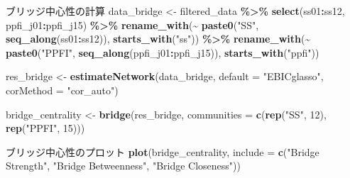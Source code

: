 \documentclass[12pt,a4paper,xelatex,ja=standard]{bxjsarticle}
\newenvironment{Shaded}{\begin{snugshade}}{\end{snugshade}}
\newcommand{\AttributeTok}[1]{\textcolor[rgb]{0.13,0.29,0.53}{#1}}
\newcommand{\DecValTok}[1]{\textcolor[rgb]{0.00,0.00,0.81}{#1}}
\newcommand{\FunctionTok}[1]{\textcolor[rgb]{0.13,0.29,0.53}{\textbf{#1}}}
\newcommand{\NormalTok}[1]{#1}
\newcommand{\OtherTok}[1]{\textcolor[rgb]{0.56,0.35,0.01}{#1}}
\newcommand{\SpecialCharTok}[1]{\textcolor[rgb]{0.81,0.36,0.00}{\textbf{#1}}}
\newcommand{\StringTok}[1]{\textcolor[rgb]{0.31,0.60,0.02}{#1}}
\begin{document}
\begin{Shaded}
\begin{Highlighting}[]
\NormalTok{ブリッジ中心性の計算}
\NormalTok{data\_bridge }\OtherTok{\textless{}{-}}\NormalTok{ filtered\_data }\SpecialCharTok{\%\textgreater{}\%} 
  \FunctionTok{select}\NormalTok{(ss01}\SpecialCharTok{:}\NormalTok{ss12, ppfi\_j01}\SpecialCharTok{:}\NormalTok{ppfi\_j15) }\SpecialCharTok{\%\textgreater{}\%}
  \FunctionTok{rename\_with}\NormalTok{(}\SpecialCharTok{\textasciitilde{}} \FunctionTok{paste0}\NormalTok{(}\StringTok{"SS"}\NormalTok{, }\FunctionTok{seq\_along}\NormalTok{(ss01}\SpecialCharTok{:}\NormalTok{ss12)),}
              \FunctionTok{starts\_with}\NormalTok{(}\StringTok{"ss"}\NormalTok{)) }\SpecialCharTok{\%\textgreater{}\%}
  \FunctionTok{rename\_with}\NormalTok{(}\SpecialCharTok{\textasciitilde{}} \FunctionTok{paste0}\NormalTok{(}\StringTok{"PPFI"}\NormalTok{, }\FunctionTok{seq\_along}\NormalTok{(ppfi\_j01}\SpecialCharTok{:}\NormalTok{ppfi\_j15)), }
              \FunctionTok{starts\_with}\NormalTok{(}\StringTok{"ppfi"}\NormalTok{))}

\NormalTok{res\_bridge }\OtherTok{\textless{}{-}} \FunctionTok{estimateNetwork}\NormalTok{(data\_bridge,}
                              \AttributeTok{default =} \StringTok{"EBICglasso"}\NormalTok{,}
                              \AttributeTok{corMethod =} \StringTok{"cor\_auto"}\NormalTok{)}

\NormalTok{bridge\_centrality }\OtherTok{\textless{}{-}} \FunctionTok{bridge}\NormalTok{(res\_bridge, }
               \AttributeTok{communities =} \FunctionTok{c}\NormalTok{(}\FunctionTok{rep}\NormalTok{(}\StringTok{"SS"}\NormalTok{, }\DecValTok{12}\NormalTok{), }\FunctionTok{rep}\NormalTok{(}\StringTok{"PPFI"}\NormalTok{, }\DecValTok{15}\NormalTok{)))}

\NormalTok{ブリッジ中心性のプロット}
\FunctionTok{plot}\NormalTok{(bridge\_centrality, }
     \AttributeTok{include =} \FunctionTok{c}\NormalTok{(}\StringTok{"Bridge Strength"}\NormalTok{, }\StringTok{"Bridge Betweenness"}\NormalTok{,}
                                    \StringTok{"Bridge Closeness"}\NormalTok{))}
\end{Highlighting}
\end{Shaded}

\clearpage
\end{document}

